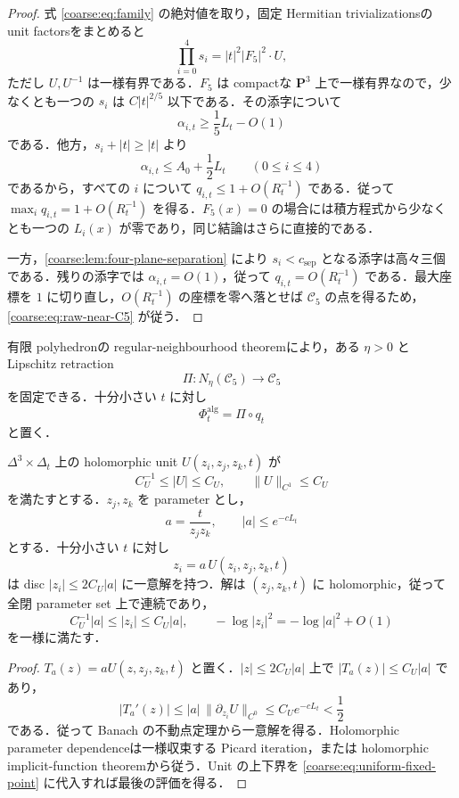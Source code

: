 \documentclass[a4paper,11pt]{ltjsarticle}
\numberwithin{equation}{section}
\theoremstyle{plain}
\theoremstyle{definition}
\theoremstyle{remark}
\newcommand{\PP}{\mathbf P}\newcommand{\CC}{\mathbf C}\newcommand{\RR}{\mathbf R}\newcommand{\ZZ}{\mathbf Z}\newcommand{\NN}{\mathbf N}
\newcommand{\Cfive}{\mathcal C_5}\newcommand{\dsq}{d_{\square}}\newcommand{\Lt}{L_t}\newcommand{\Rt}{R_t}
\begin{document}
\begin{proof}
式 \eqref{coarse:eq:family} の絶対値を取り，固定 Hermitian trivializationsの unit factorsをまとめると
\[
 \prod_{i=0}^4s_i=|t|^2|F_5|^2\cdot U,
\]
ただし $U,U^{-1}$ は一様有界である．$F_5$ は compactな $\PP^3$ 上で一様有界なので，少なくとも一つの $s_i$ は
$C|t|^{2/5}$ 以下である．その添字について
\[
 \alpha_{i,t}\ge \frac15L_t-O(1)
\]
である．他方，$s_i+|t|\ge |t|$ より
\[
 \alpha_{i,t}\le A_0+\frac12L_t
 \qquad(0\le i\le4)
\]
であるから，すべての $i$ について $q_{i,t}\le1+O(R_t^{-1})$ である．従って
$\max_iq_{i,t}=1+O(R_t^{-1})$ を得る．$F_5(x)=0$ の場合には積方程式から少なくとも一つの
$L_i(x)$ が零であり，同じ結論はさらに直接的である．

一方，\cref{coarse:lem:four-plane-separation} により $s_i<c_{\mathrm{sep}}$ となる添字は高々三個である．残りの添字では
$\alpha_{i,t}=O(1)$，従って $q_{i,t}=O(R_t^{-1})$ である．最大座標を $1$ に切り直し，$O(R_t^{-1})$ の座標を零へ落とせば
$\Cfive$ の点を得るため，\eqref{coarse:eq:raw-near-C5} が従う．
\end{proof}

有限 polyhedronの regular-neighbourhood theoremにより，ある $\eta>0$ と Lipschitz retraction
\[
 \Pi:N_\eta(\Cfive)\longrightarrow\Cfive
\]
を固定できる．十分小さい $t$ に対し
\begin{equation}\label{coarse:eq:Phi-alg}
 \Phi_t^{\mathrm{alg}}=\Pi\circ q_t
\end{equation}
と置く．

\begin{lemma}\label{coarse:lem:uniform-product-solve}
$\Delta^3\times\Delta_t$ 上の holomorphic unit $U(z_i,z_j,z_k,t)$ が
\[
 C_U^{-1}\le |U|\le C_U,
 \qquad
 \|U\|_{C^1}\le C_U
\]
を満たすとする．$z_j,z_k$ を parameter とし，
\[
 a=\frac{t}{z_jz_k},
 \qquad |a|\le e^{-cL_t}
\]
とする．十分小さい $t$ に対し
\begin{equation}\label{coarse:eq:uniform-fixed-point}
 z_i=a\,U(z_i,z_j,z_k,t)
\end{equation}
は disc $|z_i|\le2C_U|a|$ に一意解を持つ．解は $(z_j,z_k,t)$ に holomorphic，従って全閉 parameter set 上で連続であり，
\[
 C_U^{-1}|a|\le |z_i|\le C_U|a|,
 \qquad
 -\log|z_i|^2=-\log|a|^2+O(1)
\]
を一様に満たす．
\end{lemma}

\begin{proof}
$T_a(z)=aU(z,z_j,z_k,t)$ と置く．$|z|\le2C_U|a|$ 上で
$|T_a(z)|\le C_U|a|$ であり，
\[
 |T_a'(z)|\le |a|\,\|\partial_{z_i}U\|_{C^0}
 \le C_Ue^{-cL_t}<\frac12
\]
である．従って Banach の不動点定理から一意解を得る．Holomorphic parameter dependenceは一様収束する Picard iteration，または holomorphic implicit-function theoremから従う．Unit の上下界を \eqref{coarse:eq:uniform-fixed-point} に代入すれば最後の評価を得る．
\end{proof}
\end{document}
